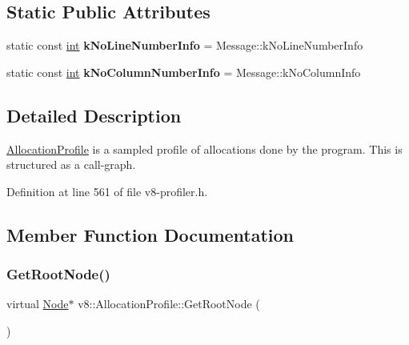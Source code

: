 \subsection*{Static Public Attributes}
\begin{DoxyCompactItemize}
\item 
\mbox{\label{classv8_1_1AllocationProfile_a26fdfe9e4846d26c83d0ad8c2ed2d783}} 
static const \mbox{\hyperlink{classint}{int}} {\bfseries k\+No\+Line\+Number\+Info} = Message\+::k\+No\+Line\+Number\+Info
\item 
\mbox{\label{classv8_1_1AllocationProfile_a9cfa103f73e82629694eee3734826eb7}} 
static const \mbox{\hyperlink{classint}{int}} {\bfseries k\+No\+Column\+Number\+Info} = Message\+::k\+No\+Column\+Info
\end{DoxyCompactItemize}


\subsection{Detailed Description}
\mbox{\hyperlink{classv8_1_1AllocationProfile}{Allocation\+Profile}} is a sampled profile of allocations done by the program. This is structured as a call-\/graph. 

Definition at line 561 of file v8-\/profiler.\+h.



\subsection{Member Function Documentation}
\mbox{\label{classv8_1_1AllocationProfile_afea045dae30df5477088e2f0b7edb6c4}} 
\subsubsection{\texorpdfstring{Get\+Root\+Node()}{GetRootNode()}}
{\footnotesize\ttfamily virtual \mbox{\hyperlink{structv8_1_1AllocationProfile_1_1Node}{Node}}$\ast$ v8\+::\+Allocation\+Profile\+::\+Get\+Root\+Node (\begin{DoxyParamCaption}{ }\end{DoxyParamCaption})\hspace{0.3cm}{\ttfamily [pure virtual]}}

